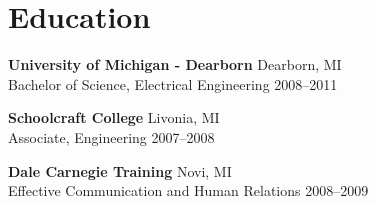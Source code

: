 \section*{Education}

\noindent
\textbf{University of Michigan - Dearborn} \hfill Dearborn, MI \\
Bachelor of Science, Electrical Engineering \hfill 2008--2011

\vspace{0.5em}

\noindent
\textbf{Schoolcraft College} \hfill Livonia, MI \\
Associate, Engineering \hfill 2007--2008

\vspace{0.5em}

\noindent
\textbf{Dale Carnegie Training} \hfill Novi, MI \\
Effective Communication and Human Relations \hfill 2008--2009